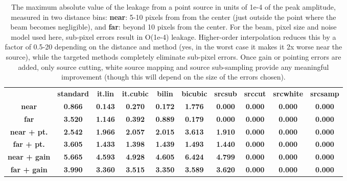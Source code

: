 \documentclass{article}
\newcommand{\good}[1]{{\color{deepgreen}\textbf{#1}}}
\newcommand{\bad}[1]{{\color{red}\textbf{#1}}}
\newcommand{\medi}[1]{{\color{orange}\textbf{#1}}}
\newcommand{\dfn}[1]{\textbf{#1}}
\begin{document}
\begin{table}
	\centering
	\begin{tabular}{cccccccccc}
			&
			\bf standard &
			\bf it.lin &
			\bf it.cubic &
			\bf bilin &
			\bf bicubic &
			\bf srcsub &
			\bf srccut &
			\bf srcwhite &
			\bf srcsamp
		\\
			\bf near &
			\bad{0.866} &
			\medi{0.143} &
			\medi{0.270} &
			\medi{0.172} &
			\bad{1.776} &
			\good{0.000} &
			\good{0.000} &
			\good{0.000} &
			\good{0.000}
		\\
			\bf far &
			\bad{3.520} &
			\bad{1.146} &
			\medi{0.392} &
			\bad{0.889} &
			\medi{0.179} &
			\good{0.000} &
			\good{0.000} &
			\good{0.000} &
			\good{0.000}
		\\
			\bf near + pt. &
			\bad{2.542} &
			\bad{1.966} &
			\bad{2.057} &
			\bad{2.015} &
			\bad{3.613} &
			\bad{1.910} &
			\good{0.000} &
			\good{0.000} &
			\good{0.000}
		\\
			\bf far + pt. &
			\bad{3.605} &
			\bad{1.433} &
			\bad{1.398} &
			\bad{1.439} &
			\bad{1.493} &
			\bad{1.440} &
			\good{0.000} &
			\good{0.000} &
			\good{0.000}
		\\
			\bf near + gain &
			\bad{5.665} &
			\bad{4.593} &
			\bad{4.928} &
			\bad{4.605} &
			\bad{6.424} &
			\bad{4.799} &
			\good{0.000} &
			\good{0.000} &
			\good{0.000}
		\\
			\bf far + gain &
			\bad{3.990} &
			\bad{3.360} &
			\bad{3.515} &
			\bad{3.350} &
			\bad{3.589} &
			\bad{3.620} &
			\good{0.000} &
			\good{0.000} &
			\good{0.000}
	\end{tabular}
	\caption{The maximum absolute value of the leakage from a point source
		in units of 1e-4 of the peak amplitude, measured in two distance bins: \dfn{near}:
		5-10 pixels from from the center (just outside the point where the beam becomes negligible),
		and \dfn{far}: beyond 10 pixels from the center. For the beam, pixel size and noise model
		used here, sub-pixel errors result in O(1e-4) leakage. Higher-order interpolation reduces this
		by a factor of 0.5-20 depending on the distance and method (yes, in the worst case it makes it
		2x worse near the source), while the targeted methods completely eliminate sub-pixel errors.
		Once gain or pointing errors are added, only source cutting, white source mapping and
		source sub-sampling provide any meaningful improvement (though this will depend on the
		size of the errors chosen).}
	\label{tab:srcleak}
\end{table}
\end{document}
